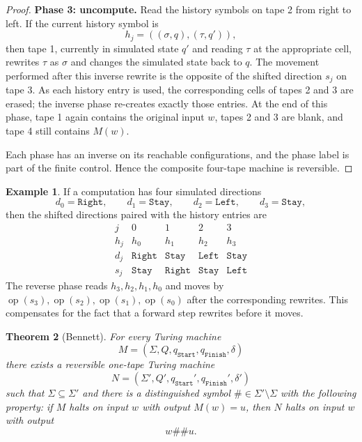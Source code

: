 \documentclass[12pt]{article}
\theoremstyle{plain}
\newtheorem{thm}{Theorem}[subsection]
\theoremstyle{definition}
\newtheorem{exmp}[thm]{Example}
\newcommand{\Start}{q_{\texttt{Start}}}
\newcommand{\Finish}{q_{\texttt{Finish}}}
\newcommand{\op}{\operatorname{op}}
\begin{document}
\begin{proof}
\medskip
\noindent\textbf{Phase 3: uncompute.}
Read the history symbols on tape 2 from right to left. If the current history symbol is
\[
h_j=((\sigma,q),(\tau,q')),
\]
then tape 1, currently in simulated state $q'$ and reading $\tau$ at the appropriate cell, rewrites $\tau$ as $\sigma$ and changes the simulated state back to $q$. The movement performed after this inverse rewrite is the opposite of the shifted direction $s_j$ on tape 3. As each history entry is used, the corresponding cells of tapes 2 and 3 are erased; the inverse phase re-creates exactly those entries. At the end of this phase, tape 1 again contains the original input $w$, tapes 2 and 3 are blank, and tape 4 still contains $M(w)$.

Each phase has an inverse on its reachable configurations, and the phase label is part of the finite control. Hence the composite four-tape machine is reversible.
\end{proof}

\begin{exmp}\label{ex:direction_shift}
If a computation has four simulated directions
\[
d_0=\texttt{Right},\qquad d_1=\texttt{Stay},\qquad d_2=\texttt{Left},\qquad d_3=\texttt{Stay},
\]
then the shifted directions paired with the history entries are
\[
\begin{array}{c|cccc}
j&0&1&2&3\\
\hline
h_j&h_0&h_1&h_2&h_3\\
d_j&\texttt{Right}&\texttt{Stay}&\texttt{Left}&\texttt{Stay}\\
s_j&\texttt{Stay}&\texttt{Right}&\texttt{Stay}&\texttt{Left}
\end{array}
\]
The reverse phase reads $h_3,h_2,h_1,h_0$ and moves by $\op(s_3),\op(s_2),\op(s_1),\op(s_0)$ after the corresponding rewrites. This compensates for the fact that a forward step rewrites before it moves.
\end{exmp}

\begin{thm}[Bennett]\label{thm:reversible}
For every Turing machine
\[
M=(\Sigma,Q,\Start,\Finish,\delta)
\]
there exists a reversible one-tape Turing machine
\[
N=(\Sigma',Q',\Start',\Finish',\delta')
\]
such that $\Sigma\subseteq\Sigma'$ and there is a distinguished symbol $\#\in\Sigma'\setminus\Sigma$ with the following property: if $M$ halts on input $w$ with output $M(w)=u$, then $N$ halts on input $w$ with output
\[
w\#\#u.
\]
\end{thm}
\end{document}
